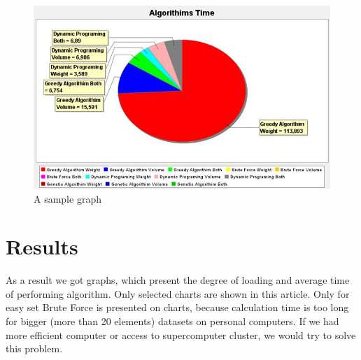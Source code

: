 \documentclass[conference,compsoc]{IEEEtran}
\begin{document}
\begin{figure}[H]
  \centering
  \includegraphics[width=\columnwidth]{image008p.jpg}
  \caption{A sample graph}
\end{figure}

\section{Results}
As a result we got graphs, which present the degree of loading and average time of performing algorithm. Only selected charts are shown in this article. Only for easy set Brute Force is presented on charts, because calculation time is too long for bigger (more than 20 elements) datasets on personal computers. If we had more 
efficient computer or access to supercomputer cluster, we would try to solve this problem.
\end{document}
